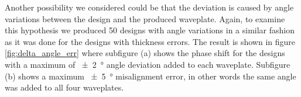 
Another possibility we considered could be that the deviation is caused by angle variations between the design and the produced waveplate. Again, to examine this hypothesis we produced 50 designs with angle variations in a similar fashion as it was done for the designs with thickness errors. The result is shown in figure \ref{fig:delta_angle_err} where subfigure (a) shows the phase shift for the designs with a maximum of \SI{\pm2}{\degree} angle deviation added to each waveplate. Subfigure (b) shows a maximum \SI{\pm5}{\degree} misalignment error, in other words the same angle was added to all four waveplates. 

